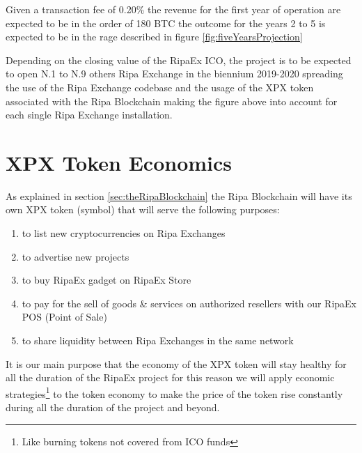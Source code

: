 Given a transaction fee of 0.20\% the revenue for the first year of operation are expected to be in the order of 180 BTC the 
outcome for the years 2 to 5 is expected to be in the rage described in figure \ref{fig:fiveYearsProjection} 
\begin{center}
	\label{fig:fiveYearsProjection}
\end{center}

Depending on the closing value of the RipaEx ICO, the project is to be expected to open N.1 to N.9 others Ripa Exchange in 
the biennium 2019-2020 spreading the use of the Ripa Exchange codebase and the usage of the XPX token associated with the 
Ripa Blockchain making the figure above into account for each single Ripa Exchange installation.

\section{XPX Token Economics}
As explained in section \ref{sec:theRipaBlockchain} the Ripa Blockchain will have its own XPX token (\PHP symbol) that 
will serve the following purposes:
	\begin{enumerate}
		\item to list new cryptocurrencies on Ripa Exchanges
		\item to advertise new projects
		\item to buy RipaEx gadget on RipaEx Store
		\item to pay for the sell of goods \& services on authorized resellers with our RipaEx POS (Point of Sale)
		\item to share liquidity between Ripa Exchanges in the same network
	\end{enumerate}
It is our main purpose that the economy of the XPX token will stay healthy for all the duration of the RipaEx project for 
this reason we will apply economic strategies\footnote{Like burning tokens not covered from ICO funds} 
to the token economy to make the price of the token rise constantly during all the duration of the project and beyond.

